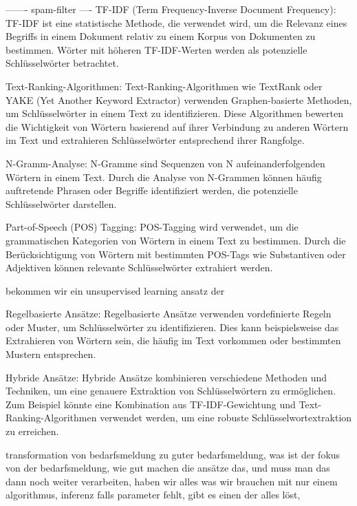 \documentclass[a4paper,12pt]{scrreprt}
\begin{document}
-------
spam-filter
\cite{shafi2017review}
\cite{khorsi2007overview}
\cite{tretyakov2004machine}
----
TF-IDF (Term Frequency-Inverse Document Frequency): TF-IDF ist eine statistische Methode, die verwendet wird, um die Relevanz eines Begriffs in einem Dokument relativ zu einem Korpus von Dokumenten zu bestimmen. Wörter mit höheren TF-IDF-Werten werden als potenzielle Schlüsselwörter betrachtet.
\cite{bafna2016document}
\cite{ramos2003using}

Text-Ranking-Algorithmen: Text-Ranking-Algorithmen wie TextRank oder YAKE (Yet Another Keyword Extractor) verwenden Graphen-basierte Methoden, um Schlüsselwörter in einem Text zu identifizieren. Diese Algorithmen bewerten die Wichtigkeit von Wörtern basierend auf ihrer Verbindung zu anderen Wörtern im Text und extrahieren Schlüsselwörter entsprechend ihrer Rangfolge.
\cite{mihalcea2004textrank}
\cite{zhang2020empirical}
\cite{pay2019ensemble}

N-Gramm-Analyse: N-Gramme sind Sequenzen von N aufeinanderfolgenden Wörtern in einem Text. Durch die Analyse von N-Grammen können häufig auftretende Phrasen oder Begriffe identifiziert werden, die potenzielle Schlüsselwörter darstellen.
\cite{pirk2019implementierung}


Part-of-Speech (POS) Tagging: POS-Tagging wird verwendet, um die grammatischen Kategorien von Wörtern in einem Text zu bestimmen. Durch die Berücksichtigung von Wörtern mit bestimmten POS-Tags wie Substantiven oder Adjektiven können relevante Schlüsselwörter extrahiert werden.
\cite{kumawat2015pos}
\cite{nakagawa2007hybrid}

bekommen wir ein unsupervised learning ansatz der 

Regelbasierte Ansätze: Regelbasierte Ansätze verwenden vordefinierte Regeln oder Muster, um Schlüsselwörter zu identifizieren. Dies kann beispielsweise das Extrahieren von Wörtern sein, die häufig im Text vorkommen oder bestimmten Mustern entsprechen.

Hybride Ansätze: Hybride Ansätze kombinieren verschiedene Methoden und Techniken, um eine genauere Extraktion von Schlüsselwörtern zu ermöglichen. Zum Beispiel könnte eine Kombination aus TF-IDF-Gewichtung und Text-Ranking-Algorithmen verwendet werden, um eine robuste Schlüsselwortextraktion zu erreichen.


transformation von bedarfsmeldung zu guter bedarfsmeldung, was ist der fokus von der bedarfsmeldung, wie gut machen die ansätze das, und muss man das dann noch weiter verarbeiten, haben wir alles was wir brauchen mit nur einem algorithmus, inferenz falls parameter fehlt, gibt es einen der alles löst,
\end{document}
